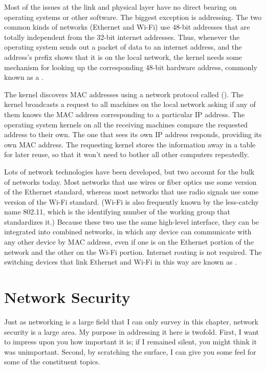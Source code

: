 Most of the issues at the link and physical layer have no direct
bearing on operating systems or other software.  The biggest exception
is addressing.  The two common kinds of networks (Ethernet and Wi-Fi)
use 48-bit addresses that are totally independent from the 32-bit
internet addresses.  Thus, whenever the operating system sends out a
packet of data to an internet address, and the address's prefix shows
that it is on
the local network, the kernel needs some mechanism for looking up the
corresponding 48-bit hardware address, commonly known as a
.

The kernel discovers MAC addresses using a network protocol called
 ().  The kernel
broadcasts a request to all machines on the local network asking if
any of them knows the MAC address corresponding to a particular IP
address.  The operating system kernels on all the receiving machines
compare the requested address to their own.  The one that sees its own
IP address responds, providing its own MAC address.  The requesting
kernel stores the information away in a table for later reuse, so that
it won't need to bother all other computers repeatedly.

Lots of network technologies have been developed, but two account for
the bulk of networks today.  Most networks that use wires or fiber
optics use some version of the Ethernet standard, whereas most
networks that use radio signals use some version of the Wi-Fi standard.
(Wi-Fi is also frequently known by the less-catchy name 802.11, which
is the identifying number of the working group that standardizes
it.)  Because these two use the same high-level interface, they can be
integrated into combined networks, in which any device can communicate
with any other device by MAC address, even if one is on the Ethernet
portion of the network and the other on the Wi-Fi portion.  Internet
routing is not required.  The switching devices that link Ethernet and
Wi-Fi in this way are known as .

\section{Network Security}\label{network-security-section}

Just as networking is a large field that I can only survey in this chapter, network
security is a large area.  My purpose in addressing it here is
twofold.  First, I want to impress upon you how important it is; if I
remained silent, you might think it was unimportant.  Second, by
scratching the surface, I can give you some feel for some of the
constituent topics.

